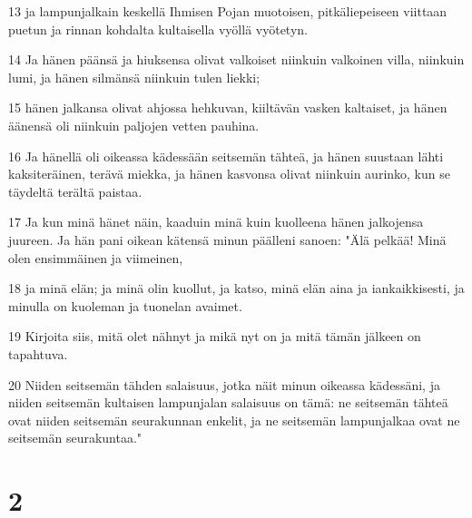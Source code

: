 \par 13 ja lampunjalkain keskellä Ihmisen Pojan muotoisen, pitkäliepeiseen viittaan puetun ja rinnan kohdalta kultaisella vyöllä vyötetyn.
\par 14 Ja hänen päänsä ja hiuksensa olivat valkoiset niinkuin valkoinen villa, niinkuin lumi, ja hänen silmänsä niinkuin tulen liekki;
\par 15 hänen jalkansa olivat ahjossa hehkuvan, kiiltävän vasken kaltaiset, ja hänen äänensä oli niinkuin paljojen vetten pauhina.
\par 16 Ja hänellä oli oikeassa kädessään seitsemän tähteä, ja hänen suustaan lähti kaksiteräinen, terävä miekka, ja hänen kasvonsa olivat niinkuin aurinko, kun se täydeltä terältä paistaa.
\par 17 Ja kun minä hänet näin, kaaduin minä kuin kuolleena hänen jalkojensa juureen. Ja hän pani oikean kätensä minun päälleni sanoen: "Älä pelkää! Minä olen ensimmäinen ja viimeinen,
\par 18 ja minä elän; ja minä olin kuollut, ja katso, minä elän aina ja iankaikkisesti, ja minulla on kuoleman ja tuonelan avaimet.
\par 19 Kirjoita siis, mitä olet nähnyt ja mikä nyt on ja mitä tämän jälkeen on tapahtuva.
\par 20 Niiden seitsemän tähden salaisuus, jotka näit minun oikeassa kädessäni, ja niiden seitsemän kultaisen lampunjalan salaisuus on tämä: ne seitsemän tähteä ovat niiden seitsemän seurakunnan enkelit, ja ne seitsemän lampunjalkaa ovat ne seitsemän seurakuntaa."

\chapter{2}

